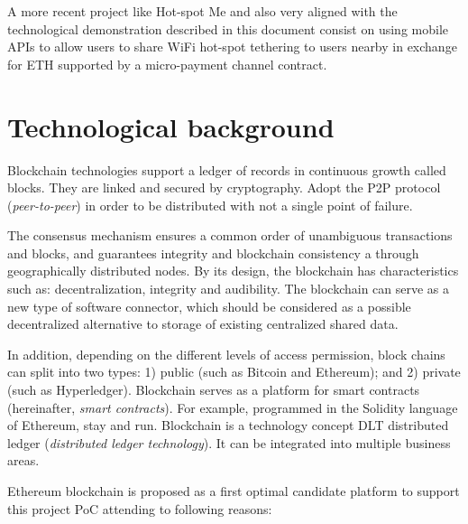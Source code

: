 \documentclass[12pt]{amsart}
\begin{document}
\begin{multicols}{2}
\vspace{0.35cm}

A more recent project like Hot-spot Me\cite{hotspotme}
and also very aligned with the technological demonstration
described in this document consist on using mobile
APIs to allow users to share WiFi hot-spot tethering
to users nearby in exchange for ETH supported by a
micro-payment channel contract.


\section{Technological background}\label{ch:bc}

\vspace{0.35cm}

Blockchain technologies support a ledger of records in
continuous growth called blocks.
They are linked and secured by
cryptography. Adopt the P2P protocol
(\textit{peer-to-peer}) in order to be distributed
with not a single point of failure.

\vspace{0.35cm}

The consensus mechanism ensures a common order
of unambiguous transactions and
blocks, and guarantees integrity and
blockchain consistency a
through geographically distributed nodes.
By its design, the blockchain has characteristics
such as: decentralization, integrity and audibility.
The blockchain can serve as a new
type of software connector, which should be considered
as a possible decentralized alternative to storage
of existing centralized shared data.

\vspace{0.35cm}

In addition, depending on the different levels of
access permission, block chains can
split into two types:
1) public (such as Bitcoin and Ethereum); and
2) private (such as Hyperledger). Blockchain serves
as a platform for smart contracts
(hereinafter, \textit{smart contracts}).
For example, programmed in the Solidity language of
Ethereum, stay and run.
Blockchain is a technology concept
DLT distributed ledger
(\textit{distributed ledger technology}).
It can be integrated into multiple business areas.

\vspace{0.35cm}

Ethereum
blockchain is proposed as a first optimal candidate platform
to support this project PoC attending to
following reasons:


\end{multicols}
\end{document}
